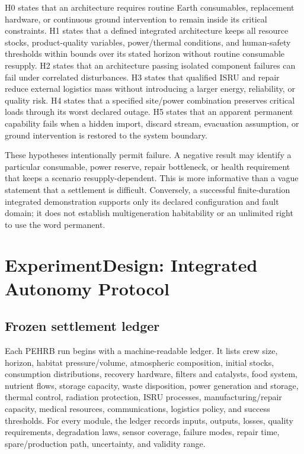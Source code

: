 \documentclass[10pt,conference]{IEEEtran}
\begin{document}
H0 states that an architecture requires routine Earth consumables, replacement hardware, or continuous ground intervention to remain inside its critical constraints. H1 states that a defined integrated architecture keeps all resource stocks, product-quality variables, power/thermal conditions, and human-safety thresholds within bounds over its stated horizon without routine consumable resupply. H2 states that an architecture passing isolated component failures can fail under correlated disturbances. H3 states that qualified ISRU and repair reduce external logistics mass without introducing a larger energy, reliability, or quality risk. H4 states that a specified site/power combination preserves critical loads through its worst declared outage. H5 states that an apparent permanent capability fails when a hidden import, discard stream, evacuation assumption, or ground intervention is restored to the system boundary.

These hypotheses intentionally permit failure. A negative result may identify a particular consumable, power reserve, repair bottleneck, or health requirement that keeps a scenario resupply-dependent. This is more informative than a vague statement that a settlement is difficult. Conversely, a successful finite-duration integrated demonstration supports only its declared configuration and fault domain; it does not establish multigeneration habitability or an unlimited right to use the word permanent.

\section{ExperimentDesign: Integrated Autonomy Protocol}
\label{sec:experiment-design}

\subsection{Frozen settlement ledger}

Each PEHRB run begins with a machine-readable ledger. It lists crew size, horizon, habitat pressure/volume, atmospheric composition, initial stocks, consumption distributions, recovery hardware, filters and catalysts, food system, nutrient flows, storage capacity, waste disposition, power generation and storage, thermal control, radiation protection, ISRU processes, manufacturing/repair capacity, medical resources, communications, logistics policy, and success thresholds. For every module, the ledger records inputs, outputs, losses, quality requirements, degradation laws, sensor coverage, failure modes, repair time, spare/production path, uncertainty, and validity range.
\end{document}
